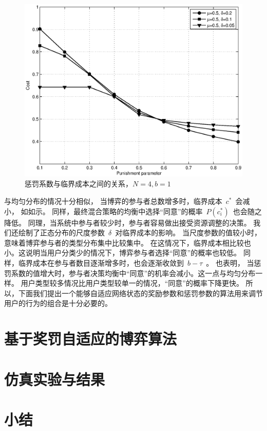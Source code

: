 \begin{figure}[!tb]
\begin{centering}
\includegraphics[scale=0.6]{bayesian_normal_punish_parameter_vs_contribute_probability.eps}
\caption{惩罚系数与临界成本之间的关系，$N=4, b=1$}
\label{fig:bayesian_normal_puni_para_vs_cont_prob}
\end{centering}
\end{figure}

与均匀分布的情况十分相似，
当博弈的参与者总数增多时，临界成本~$c^*$~会减小， 如如示。
同样，最终混合策略的均衡中选择“同意”的概率~$P(c_i^*)$~也会随之降低。
同理，当系统中参与者较少时，参与者容易做出接受资源调整的决策。
我们还绘制了正态分布的尺度参数~$\delta$~对临界成本的影响。
当尺度参数的值较小时，意味着博弈参与者的类型分布集中比较集中。
在这情况下，临界成本相比较也小。这说明当用户分类少的情况下，博弈参与者选择“同意”的概率也较低。
同样，临界成本在参与者数目逐渐增多时，也会逐渐收敛到~$b-\tau$~。
也表明，
当惩罚系数的值增大时，参与者决策均衡中“同意”的机率会减小。这一点与均匀分布一样。
用户类型较多情况比用户类型较单一的情况，“同意”的概率下降更快。
所以，下面我们提出一个能够自适应网络状态的奖励参数和惩罚参数的算法用来调节用户的行为的组合是十分必要的。

\section{基于奖罚自适应的博弈算法}
\section{仿真实验与结果}

\section{小结}
